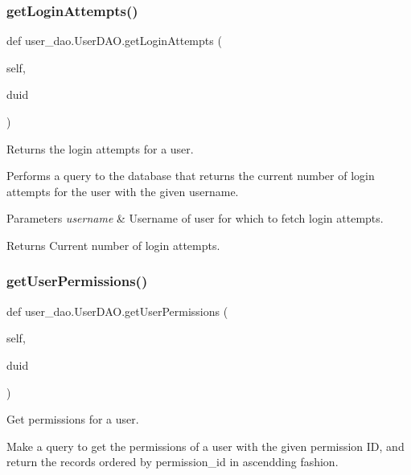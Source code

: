 \subsubsection{\texorpdfstring{get\+Login\+Attempts()}{getLoginAttempts()}}
{\footnotesize\ttfamily def user\+\_\+dao.\+User\+D\+A\+O.\+get\+Login\+Attempts (\begin{DoxyParamCaption}\item[{}]{self,  }\item[{}]{duid }\end{DoxyParamCaption})}



Returns the login attempts for a user. 

Performs a query to the database that returns the current number of login attempts for the user with the given username.


\begin{DoxyParams}{Parameters}
{\em username} & Username of user for which to fetch login attempts.\\
\hline
\end{DoxyParams}
\begin{DoxyReturn}{Returns}
Current number of login attempts. 
\end{DoxyReturn}
\mbox{\label{classuser__dao_1_1_user_d_a_o_a176984c2fe0442ebc4d0edd4371bdeee}} 
\subsubsection{\texorpdfstring{get\+User\+Permissions()}{getUserPermissions()}}
{\footnotesize\ttfamily def user\+\_\+dao.\+User\+D\+A\+O.\+get\+User\+Permissions (\begin{DoxyParamCaption}\item[{}]{self,  }\item[{}]{duid }\end{DoxyParamCaption})}



Get permissions for a user. 

Make a query to get the permissions of a user with the given permission ID, and return the records ordered by permission\+\_\+id in ascendding fashion.


